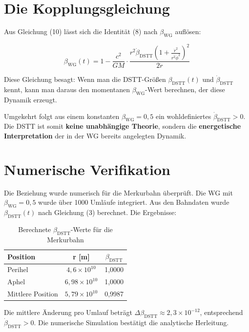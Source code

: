\documentclass[12pt,a4paper]{article}
\begin{document}
\section{Die Kopplungsgleichung}

Aus Gleichung (10) lässt sich die Identität (8) nach \(\beta_{\text{WG}}\) auflösen:

\begin{equation}
\boxed{\beta_{\text{WG}}(t) = 1 - \frac{c^2}{GM} \cdot \frac{r^2 \dot{\beta}_{\text{DSTT}} \left(1 + \frac{\dot{r}^2}{r^2\dot{\phi}^2}\right)^2}{2\dot{r}}}
\end{equation}

Diese Gleichung besagt: Wenn man die DSTT-Größen \(\beta_{\text{DSTT}}(t)\) und \(\dot{\beta}_{\text{DSTT}}\) kennt, kann man daraus den momentanen \(\beta_{\text{WG}}\)-Wert berechnen, der diese Dynamik erzeugt.

Umgekehrt folgt aus einem konstanten \(\beta_{\text{WG}} = 0,5\) ein wohldefiniertes \(\dot{\beta}_{\text{DSTT}} > 0\). Die DSTT ist somit \textbf{keine unabhängige Theorie}, sondern die \textbf{energetische Interpretation} der in der WG bereits angelegten Dynamik.

\section{Numerische Verifikation}

Die Beziehung wurde numerisch für die Merkurbahn überprüft. Die WG mit \(\beta_{\text{WG}} = 0,5\) wurde über 1000 Umläufe integriert. Aus den Bahndaten wurde \(\beta_{\text{DSTT}}(t)\) nach Gleichung (3) berechnet. Die Ergebnisse:

\begin{table}[h]
\centering
\begin{tabular}{|l|c|c|}
\hline
\textbf{Position} & \textbf{r [m]} & \textbf{\(\beta_{\text{DSTT}}\)} \\
\hline
Perihel & \(4,6 \times 10^{10}\) & 1,0000 \\
Aphel & \(6,98 \times 10^{10}\) & 1,0000 \\
Mittlere Position & \(5,79 \times 10^{10}\) & 0,9987 \\
\hline
\end{tabular}
\caption{Berechnete \(\beta_{\text{DSTT}}\)-Werte für die Merkurbahn}
\end{table}

Die mittlere Änderung pro Umlauf beträgt \(\Delta \beta_{\text{DSTT}} \approx 2,3 \times 10^{-12}\), entsprechend \(\dot{\beta}_{\text{DSTT}} > 0\). Die numerische Simulation bestätigt die analytische Herleitung.
\end{document}
